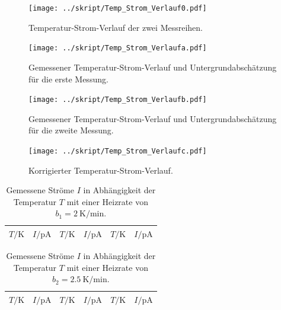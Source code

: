 \begin{figure}
\centering
\texttt{[image: ../skript/Temp\_Strom\_Verlauf0.pdf]}
\caption{Temperatur-Strom-Verlauf der zwei Messreihen.}
\label{fig:Verlauf}
\end{figure}




\begin{figure}[H]
\centering
\texttt{[image: ../skript/Temp\_Strom\_Verlaufa.pdf]}
\caption{Gemessener Temperatur-Strom-Verlauf und Untergrundabschätzung für die erste Messung.}
\label{fig:Messwertea}
\texttt{[image: ../skript/Temp\_Strom\_Verlaufb.pdf]}
\caption{Gemessener Temperatur-Strom-Verlauf und Untergrundabschätzung für die zweite Messung.}
\label{fig:Messwerteb}
\end{figure}
\begin{figure}
\centering
\texttt{[image: ../skript/Temp\_Strom\_Verlaufc.pdf]}
\caption{Korrigierter Temperatur-Strom-Verlauf.}
\label{fig:Messwertec}
\end{figure}

\begin{table}[htpb]
	\centering
	\begin{tabular}{cc|cc|cc}
		\midrule
		\midrule
		$T / \si{\kelvin}$ &
		$I / \si{\pA}$ &
		$T / \si{\kelvin}$ &
		$I / \si{\pA}$ &
		$T / \si{\kelvin}$ &
		$I / \si{\pA}$ \\
		\midrule
		
		\midrule
		\midrule
	\end{tabular}
	\caption{Gemessene Ströme $I$ in Abhängigkeit der Temperatur $T$ mit
		einer Heizrate von $b_1 = \SI{2}{\kelvin\per\minute}$.}
	\label{tab:tab10}
\end{table}
%
\begin{table}[htpb]
	\centering
	\begin{tabular}{cc|cc|cc}
		\midrule
		\midrule
		$T / \si{\kelvin}$ &
		$I / \si{\pA}$ &
		$T / \si{\kelvin}$ &
		$I / \si{\pA}$ &
		$T / \si{\kelvin}$ &
		$I / \si{\pA}$ \\
		\midrule
		
		\midrule
		\midrule
	\end{tabular}
	\caption{Gemessene Ströme $I$ in Abhängigkeit der Temperatur $T$ mit
		einer Heizrate von $b_2 = \SI{2.5}{\kelvin\per\minute}$.}
	\label{tab:tab20}
\end{table}



